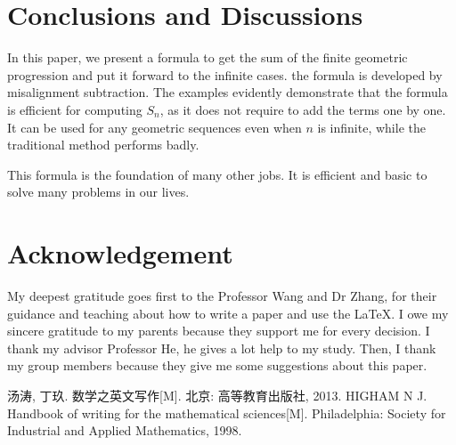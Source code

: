 \section{Conclusions and Discussions}\label{S:conclusions-and-discussions}
In this paper, we present a formula to get the sum of the finite geometric progression and put it forward to the infinite cases. the formula is developed by misalignment subtraction. The examples evidently demonstrate that the formula is efficient for computing $S_n$, as it does not require to add the terms one by one.  It can be used for any geometric sequences even when $n$ is infinite, while the traditional method performs badly. 

This formula is the foundation of many other jobs. It is efficient and basic to solve many problems in our lives.



\section*{Acknowledgement}
My deepest gratitude goes first to the Professor Wang and Dr Zhang, for their guidance and teaching about how to write a paper and use the \LaTeX. I owe my sincere gratitude to my parents because they support me for every decision. I thank my advisor Professor He, he gives a lot help to my study. Then, I thank my group members because they give me some suggestions about this paper.



\begin{thebibliography}{9}
     汤涛, 丁玖. 数学之英文写作[M]. 北京: 高等教育出版社, 2013.
     HIGHAM N J. Handbook of writing for the mathematical sciences[M]. Philadelphia: Society for Industrial and Applied Mathematics, 1998.
\end{thebibliography}
